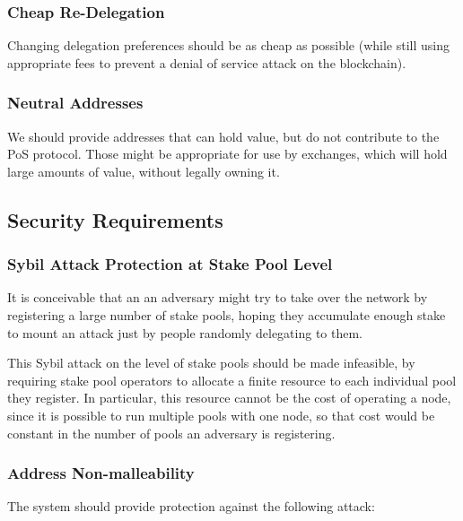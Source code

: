 \documentclass[11pt,a4paper]{article}
\begin{document}
\subsubsection{Cheap Re-Delegation}
\label{cheap-re-delegation}

Changing delegation preferences should be as cheap as possible (while
still using appropriate fees to prevent a denial of service attack on
the blockchain).

\subsubsection{Neutral Addresses}
\label{neutral-addresses}

We should provide addresses that can hold value, but do not contribute
to the PoS protocol. Those might be appropriate for use by exchanges,
which will hold large amounts of value, without legally owning it.

\subsection{Security Requirements}
\label{security-requirements}

\subsubsection{Sybil Attack Protection at Stake Pool Level}
\label{sybil-attack-protection-at-stake-pool-level}

It is conceivable that an an adversary might try to take over the
network by registering a large number of stake pools, hoping they
accumulate enough stake to mount an attack just by people randomly
delegating to them.

This Sybil attack on the level of stake pools should be made infeasible,
by requiring stake pool operators to allocate a finite resource to each
individual pool they register. In particular, this resource cannot be
the cost of operating a node, since it is possible to run multiple pools
with one node, so that cost would be constant in the number of pools an
adversary is registering.

\subsubsection{Address Non-malleability}
\label{address-nonmalleability}

The system should provide protection against the following attack:
\end{document}
